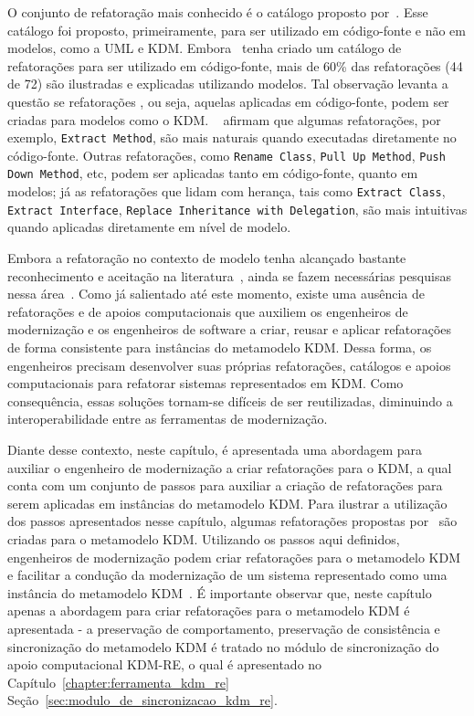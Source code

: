 O conjunto de refatoração mais conhecido é o catálogo proposto por~. Esse catálogo foi proposto, primeiramente, para ser utilizado em código-fonte e não em modelos, como a UML e KDM. Embora~ tenha criado um catálogo de refatorações para ser utilizado em código-fonte, mais de 60\% das refatorações (44 de 72) são ilustradas e explicadas utilizando modelos. Tal observação levanta a questão se refatorações , ou seja, aquelas aplicadas em código-fonte, podem ser criadas para modelos como o KDM. ~ afirmam que algumas refatorações, por exemplo, \texttt{Extract Method}, são mais naturais quando executadas diretamente no código-fonte. Outras refatorações, como \texttt{Rename Class}, \texttt{Pull Up Method}, \texttt{Push Down Method}, etc, podem ser aplicadas tanto em código-fonte, quanto em modelos; já as refatorações que lidam com herança, tais como \texttt{Extract Class}, \texttt{Extract Interface}, \texttt{Replace Inheritance with Delegation}, são mais intuitivas quando aplicadas diretamente em nível de modelo. 

Embora a refatoração no contexto de modelo tenha alcançado bastante reconhecimento e aceitação na literatura~\cite{Moghadam_2012, Maneerat_2011, Fourati_2011, Einarsson_2012, Steimann_2015, Akiyama_2011, Jensen_2010, Arendt_2012, Millan_2009, Tom_2008_2008}, ainda se fazem necessárias pesquisas nessa área~\cite{durelli_systematic_mapping, revisao_sistematica_uml_refactoring}. Como já salientado até este momento, existe uma ausência de refatorações e de apoios computacionais que auxiliem os engenheiros de modernização e os engenheiros de software a criar, reusar e aplicar refatorações de forma consistente para instâncias do metamodelo KDM. Dessa forma, os engenheiros precisam desenvolver suas próprias refatorações, catálogos e apoios computacionais para refatorar sistemas representados em KDM. Como consequência, essas soluções tornam-se difíceis de ser reutilizadas, diminuindo a interoperabilidade entre as ferramentas de modernização. 

Diante desse contexto, neste capítulo, é apresentada uma abordagem para auxiliar o engenheiro de modernização a criar refatorações para o KDM, a qual conta com um conjunto de passos para auxiliar a criação de refatorações para serem aplicadas em instâncias do metamodelo KDM. Para ilustrar a utilização dos passos apresentados nesse capítulo, algumas refatorações propostas por~ são criadas para o metamodelo KDM. Utilizando os passos aqui definidos, engenheiros de modernização podem criar refatorações para o metamodelo KDM e facilitar a condução da modernização de um sistema representado como uma instância do metamodelo KDM~\cite{durelli_catalogo, durelli_VEM_ferramenta}. É importante observar que, neste capítulo apenas a abordagem para criar refatorações para o metamodelo KDM é apresentada - a preservação de comportamento, preservação de consistência e sincronização do metamodelo KDM é tratado no módulo de sincronização do apoio computacional KDM-RE, o qual é apresentado no Capítulo~\ref{chapter:ferramenta_kdm_re}  Seção~\ref{sec:modulo_de_sincronizacao_kdm_re}. 


